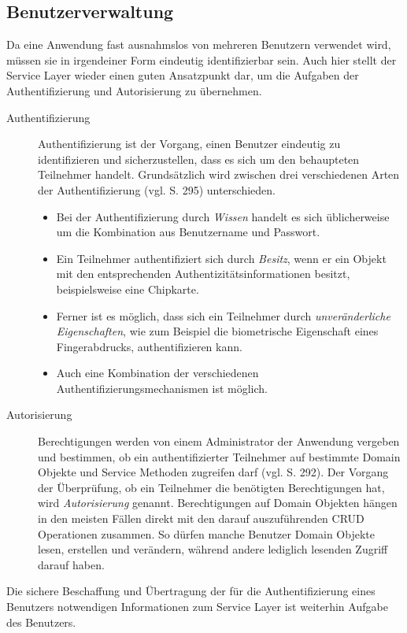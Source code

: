\subsection{Benutzerverwaltung}\label{service:security}
Da eine Anwendung fast ausnahmslos von mehreren Benutzern verwendet wird, müssen
sie in irgendeiner Form eindeutig identifizierbar sein. Auch hier stellt der Service
Layer wieder einen guten Ansatzpunkt dar, um die Aufgaben der Authentifizierung
und Autorisierung zu übernehmen.

\begin{description}
\item[Authentifizierung] Authentifizierung ist der Vorgang, einen Benutzer
eindeutig zu identifizieren und sicherzustellen, dass es sich um den
behaupteten Teilnehmer handelt. Grundsätzlich wird zwischen drei verschiedenen
Arten der Authentifizierung (vgl. \cite{kruth:2004} S. 295) unterschieden.
\begin{itemize}
\item Bei der Authentifizierung durch \emph{Wissen} handelt es sich
üblicherweise um die Kombination aus Benutzername und Passwort.
\item Ein Teilnehmer authentifiziert sich durch \emph{Besitz}, wenn er ein
Objekt mit den entsprechenden Authentizitätsinformationen besitzt,
beispielsweise eine Chipkarte.
\item Ferner ist es möglich, dass sich ein Teilnehmer durch
\emph{unveränderliche Eigenschaften}, wie zum Beispiel die biometrische
Eigenschaft eines Fingerabdrucks, authentifizieren kann.
\item Auch eine Kombination der verschiedenen Authentifizierungsmechanismen ist
möglich.
\end{itemize}
\item[Autorisierung] Berechtigungen werden von einem Administrator der Anwendung
vergeben und bestimmen, ob ein authentifizierter Teilnehmer auf bestimmte Domain
Objekte und Service Methoden zugreifen darf (vgl. \cite{kruth:2004} S. 292). Der
Vorgang der Überprüfung, ob ein Teilnehmer die benötigten Berechtigungen hat,
wird \emph{Autorisierung} genannt. Berechtigungen auf Domain Objekten hängen in den
meisten Fällen direkt mit den darauf auszuführenden \ac{CRUD} Operationen
zusammen. So dürfen manche Benutzer Domain Objekte lesen, erstellen und
verändern, während andere lediglich lesenden Zugriff darauf haben.
\end{description}

Die sichere Beschaffung und Übertragung der für die Authentifizierung eines
Benutzers notwendigen Informationen zum Service Layer ist weiterhin Aufgabe des
Benutzers.

